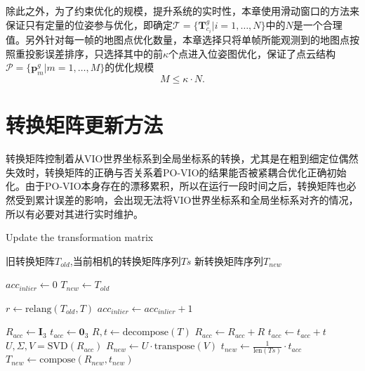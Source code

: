 除此之外，为了约束优化的规模，提升系统的实时性，本章使用滑动窗口的方法来保证只有定量的位姿参与优化，即确定$\mathcal{T} = \{ \symbf{T}_{c_i}^g | i=1,\dots, N\}$中的$N$是一个合理值。另外针对每一帧的地图点优化数量，本章选择只将单帧所能观测到的地图点按照重投影误差排序，只选择其中的前$\kappa$个点进入位姿图优化，保证了点云结构$\mathcal{P} = \{\symbf{p}^g_m | m = 1, \dots, M\}$的优化规模
\begin{equation}
  M \le \kappa \cdot N.
\end{equation}

\section{转换矩阵更新方法}

转换矩阵控制着从VIO世界坐标系到全局坐标系的转换，尤其是在粗到细定位偶然失效时，转换矩阵的正确与否关系着PO-VIO的结果能否被紧耦合优化正确初始化。由于PO-VIO本身存在的漂移累积，所以在运行一段时间之后，转换矩阵也必然受到累计误差的影响，会出现无法将VIO世界坐标系和全局坐标系对齐的情况，所以有必要对其进行实时维护。

\renewcommand{\algorithmicrequire}{\textbf{输入：}\unskip}
\renewcommand{\algorithmicensure}{\textbf{输出：}\unskip}
\begin{algorithm}
  \caption{Update the transformation matrix}
  \label{alg3}
  \small
  \begin{algorithmic}[1]
    \REQUIRE 旧转换矩阵$T_{old}$,当前相机的转换矩阵序列$Ts$
    \ENSURE 新转换矩阵序列$T_{new}$

    \STATE $acc_{inlier} \leftarrow 0$
    \STATE $T_{new} \leftarrow T_{old}$

      \STATE $r \leftarrow \text{relang}(T_{old}, T)$
        \STATE $acc_{inlier} \leftarrow acc_{inlier} + 1$
      \ENDIF
    \ENDFOR

      \STATE $R_{acc} \leftarrow \symbf{I}_3$
      \STATE $t_{acc} \leftarrow \symbf{0}_3$
        \STATE $R,t \leftarrow \text{decompose}(T)$
        \STATE $R_{acc} \leftarrow R_{acc} + R$
        \STATE $t_{acc} \leftarrow t_{acc} + t$
      \ENDFOR
      \STATE $U, \Sigma, V = \text{SVD}(R_{acc})$
      \STATE $R_{new} \leftarrow U\cdot \text{transpose}(V)$
      \STATE $t_{new} \leftarrow \frac{1}{\text{len}(Ts)}\cdot t_{acc}$
      \STATE $T_{new} \leftarrow \text{compose}(R_{new}, t_{new})$
    \ENDIF
  \end{algorithmic}
\end{algorithm}


